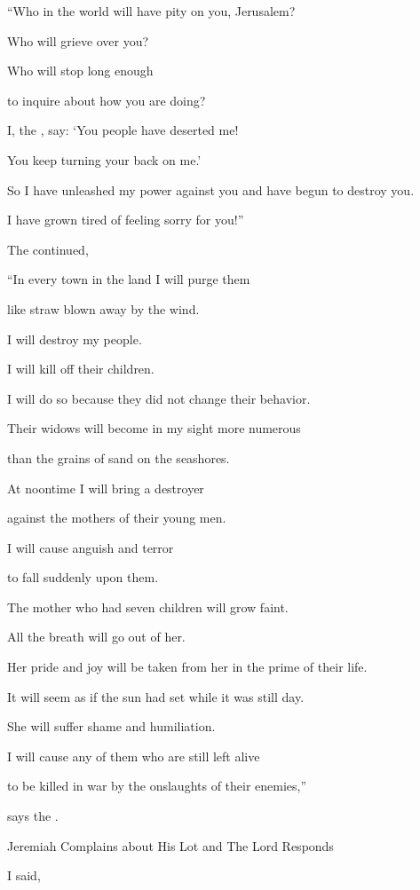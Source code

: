 {\par }{\Q “Who
in the world will have pity
on
you, Jerusalem?
\par }{\Q Who
will grieve
over you?
\par }{\Q Who
will stop
long enough

\par }{\Q to inquire
about how you are doing?
\par }{\Q {}I,
the {}, say: ‘You
people have deserted
me!
\par }{\Q You keep turning
your back on me.’
\par }{\Q So
I have unleashed
my power
against
you and have begun to destroy
you.

\par }{\Q I have grown tired
of feeling sorry for you!”
\par }{\PP {}The
{} continued,

\par }{\Q “In every town
in the land
I will purge
them
\par }{\Q like straw blown away by the wind.
\par }{\Q I will destroy
my people.
\par }{\Q I will
kill off
their children.
\par }{\Q I will do so because they did not
change
their behavior.
\par }{\Q {}Their widows
will become in my sight more numerous
\par }{\Q than the grains of sand
on the seashores.
\par }{\Q At noontime
I will bring
a destroyer
\par }{\Q against the mothers
of their
young men.
\par }{\Q I will cause anguish and terror
\par }{\Q to fall
suddenly upon them.
\par }{\Q {}The mother who had
seven
children
will grow faint.
\par }{\Q All the breath
will go out
of her.

\par }{\Q Her pride and joy will be taken from her in the prime of their life.
\par }{\Q It will seem as if the sun
had set while it was still
day.
\par }{\Q She will suffer shame
and humiliation.
\par }{\Q I will cause
any of them who are still left alive
\par }{\Q to be killed in war by the onslaughts
of
their enemies,”
\par }{\PP says
the {}.
\par }{\SH Jeremiah Complains about His Lot and The Lord Responds
\par }{\PP {}I said,

}
